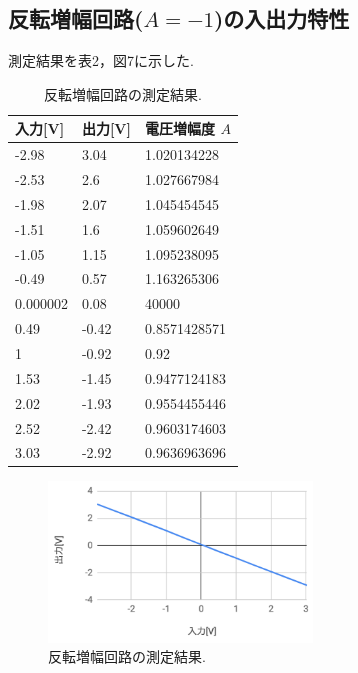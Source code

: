 \documentclass[twocolumn, 10pt,a4j]{jsarticle}
\begin{document}
    \subsection{反転増幅回路($A=-1$)の入出力特性}
        測定結果を表2，図7に示した. 


        \begin{table}[H]
          \centering
          \footnotesize
          \caption{反転増幅回路の測定結果.}
          \label{opeanpu_risouteki_tokusei}
          \begin{tabular}{lll} \hline
            入力[V] &	出力[V] & 電圧増幅度 $A$  \\ \hline

-2.98&3.04&1.020134228 \\
-2.53&2.6&1.027667984 \\
-1.98&2.07&1.045454545 \\
-1.51&1.6&1.059602649 \\
-1.05&1.15&1.095238095 \\
-0.49&0.57&1.163265306 \\
0.000002&0.08&40000 \\
0.49&-0.42&0.8571428571 \\
1&-0.92&0.92 \\
1.53&-1.45&0.9477124183 \\
2.02&-1.93&0.9554455446 \\
2.52&-2.42&0.9603174603 \\
3.03&-2.92&0.9636963696 \\ \hline
            
          \end{tabular}
        \end{table}

        \begin{figure}[]
          \begin{center}
              \includegraphics[width=7cm]{../img/hantenzoufuku_result_1.png}
              \caption{反転増幅回路の測定結果.}
          \end{center}
        \end{figure}
\end{document}
